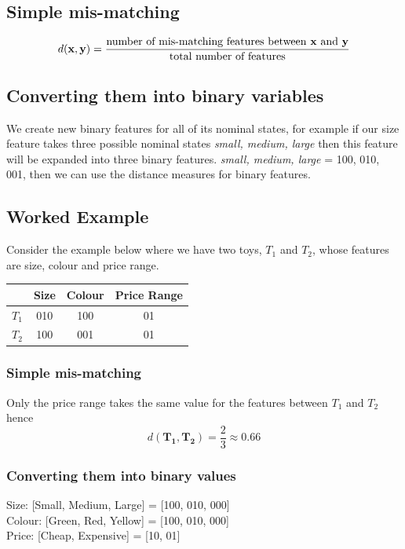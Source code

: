 \documentclass[11pt,fleqn]{book} %
\begin{document}
\subsection*{Simple mis-matching}
$$d(\mathbf{x}, \mathbf{y}) = \frac{\text{number of mis-matching features between \textbf{x} and \textbf{y}}}{\text{total number of features}}$$

\subsection*{Converting them into binary variables}
We create new binary features for all of its nominal states, for example if our size feature takes three possible nominal states \textit{{small, medium, large}} then this feature will be expanded into three binary features. \textit{{small, medium, large}} = {100, 010, 001}, then we can use the distance measures for binary features.

\subsection*{Worked Example}
Consider the example below where we have two toys, $T_1$ and $T_2$, whose features are size, colour and price range.
\begin{table}[h]
\centering
\begin{tabular}{c|c|c|c|}
\cline{2-4}
                         & Size & Colour & Price Range \\ \hline
\multicolumn{1}{|c|}{$T_1$} & 010  & 100    & 01       \\ \hline
\multicolumn{1}{|c|}{$T_2$} & 100  & 001    & 01      \\ \hline
\end{tabular}
\end{table}

\subsubsection*{Simple mis-matching}
Only the price range takes the same value for the features between $T_1$ and $T_2$ hence
$$d(\mathbf{T_1}, \mathbf{T_2}) = \frac{2}{3} \approx 0.66$$

\subsubsection*{Converting them into binary values}
Size: [Small, Medium, Large] = [100, 010, 000]\\
Colour: [Green, Red, Yellow] = [100, 010, 000]\\
Price: [Cheap, Expensive] = [10, 01]\\
\end{document}
